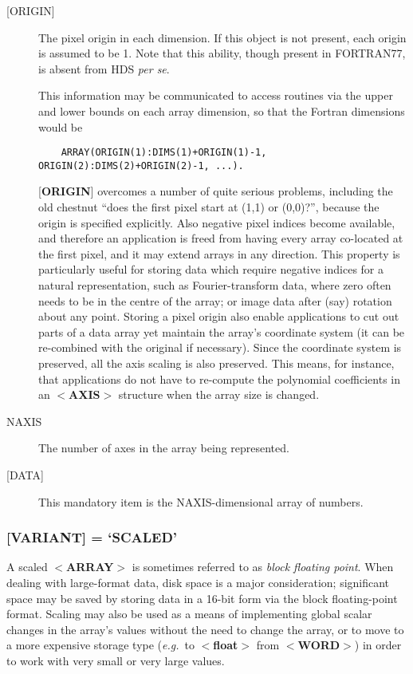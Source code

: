 \documentclass[twoside,11pt]{article}
\renewcommand{\_}{\texttt{\symbol{95}}}
\begin{document}
\begin{description}
\item [{[}ORIGIN{]}]
The pixel origin in each dimension.  If this object is not present,
each origin is assumed to be 1.  Note that this
ability, though present in FORTRAN77, is
absent from HDS {\it per se}.

This information may be communicated to 
access routines via the upper and lower bounds on each array dimension, 
so that the Fortran dimensions would be 
\begin{verbatim}
    ARRAY(ORIGIN(1):DIMS(1)+ORIGIN(1)-1, ORIGIN(2):DIMS(2)+ORIGIN(2)-1, ...).
\end{verbatim}

{[}{\bf ORIGIN}{]} overcomes a number of quite serious problems,
including the old chestnut ``does the first pixel start at (1,1) or
(0,0)?'', because the origin is specified explicitly. Also negative
pixel indices become available, and therefore an application is freed
from having every array co-located at the first pixel, and it may extend
arrays in any direction. This property is particularly useful for
storing data which require negative indices for a natural
representation, such as Fourier-transform data, where zero often needs to
be in the centre of the array; or image data after (say) rotation about
any point.  Storing a pixel origin also enable applications to cut out parts
of a data array yet maintain the array's coordinate system (it can be
re-combined with the original if necessary). Since the coordinate
system is preserved, all the axis scaling is also preserved. This means,
for instance, that applications do not have to re-compute the polynomial
coefficients in an $<${\bf AXIS}$>$ structure when the array size is
changed.
\item [NAXIS]
The number of axes in the array being represented.
\item [{[}DATA{]}]
This mandatory item is the NAXIS-dimensional array of numbers.
\end{description}

\subsubsection{{[}{\bf VARIANT}{]} = `SCALED'}
A scaled \mbox{$<${\bf ARRAY}$>$} is sometimes referred
to as {\it block floating point}. 
When dealing with large-format data, disk space is a major
consideration; significant space may be saved by storing data in a
16-bit form via the block floating-point format.  Scaling may also be
used as a means of implementing global scalar changes in the array's
values without the need to change the array, or to move to a more
expensive storage type ({\it e.g.}\  to $<${\bf float}$>$ from
$<${\bf \_WORD}$>$) in order to work with very small or very large values. 
\end{document}
